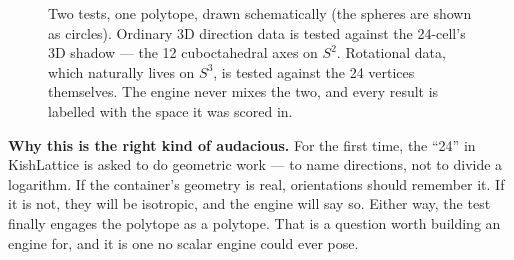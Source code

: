 \documentclass[11pt, letterpaper, openany]{book}
\newcommand{\uvec}[1]{\hat{\mathbf{#1}}}
\begin{document}
\begin{figure}[H]
\centering
{}
\caption{Two tests, one polytope, drawn schematically (the spheres are shown as circles). Ordinary 3D
direction data is tested against the 24-cell's 3D shadow --- the 12 cuboctahedral axes on $S^2$.
Rotational data, which naturally lives on $S^3$, is tested against the 24 vertices themselves. The
engine never mixes the two, and every result is labelled with the space it was scored in.}
\end{figure}

\begin{signalbox}
\textbf{Why this is the right kind of audacious.} For the first time, the ``24'' in KishLattice is
asked to do geometric work --- to name directions, not to divide a logarithm. If the container's
geometry is real, orientations should remember it. If it is not, they will be isotropic, and the engine
will say so. Either way, the test finally engages the polytope as a polytope. That is a question worth
building an engine for, and it is one no scalar engine could ever pose.
\end{signalbox}
\end{document}
